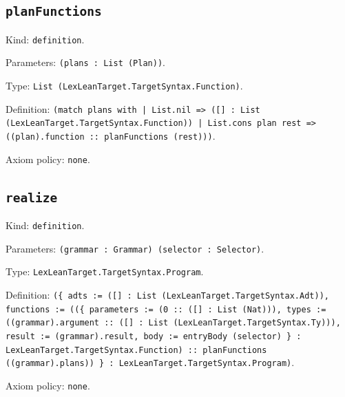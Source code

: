 \documentclass[11pt]{article}
\begin{document}
\subsection*{\texttt{planFunctions}}
\noindent Kind: \texttt{definition}.\par
\noindent Parameters: \texttt{(plans : List (Plan))}.\par
\noindent Type: \texttt{List (LexLeanTarget.TargetSyntax.Function)}.\par
\noindent Definition: \texttt{(match plans with | List.nil => ([] : List (LexLeanTarget.TargetSyntax.Function)) | List.cons plan rest => ((plan).function :: planFunctions (rest)))}.\par
\noindent Axiom policy: \texttt{none}.\par
\subsection*{\texttt{realize}}
\noindent Kind: \texttt{definition}.\par
\noindent Parameters: \texttt{(grammar : Grammar) (selector : Selector)}.\par
\noindent Type: \texttt{LexLeanTarget.TargetSyntax.Program}.\par
\noindent Definition: \texttt{(\{ adts := ([] : List (LexLeanTarget.TargetSyntax.Adt)), functions := ((\{ parameters := (0 :: ([] : List (Nat))), types := ((grammar).argument :: ([] : List (LexLeanTarget.TargetSyntax.Ty))), result := (grammar).result, body := entryBody (selector) \} : LexLeanTarget.TargetSyntax.Function) :: planFunctions ((grammar).plans)) \} : LexLeanTarget.TargetSyntax.Program)}.\par
\noindent Axiom policy: \texttt{none}.\par
\end{document}
